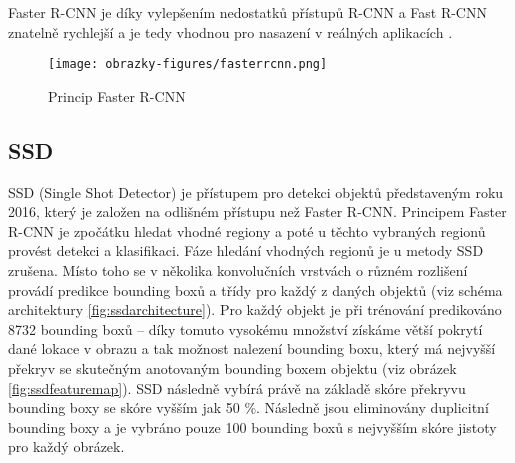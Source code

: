 Faster R-CNN je díky vylepšením nedostatků přístupů R-CNN a Fast R-CNN znatelně rychlejší a je tedy vhodnou pro nasazení v reálných aplikacích \cite{ObjectDetectionAlgorithms}.

\begin{figure}[!htbp]
    \centering
    \texttt{[image: obrazky-figures/fasterrcnn.png]}
    \caption{Princip Faster R-CNN \cite{ObjectDetectionAlgorithms}}
\end{figure} 

\subsection{SSD}

\iffalse
SSD (Single Shot Detector) je přístupem z roku 2016 pro detekci objektů, která je založena na odlišném principu než Faster R-CNN. Ve Faster R-CNN je hledání vhodných regionů a klasifikace daných regionů rozdělena, v SSD je fáze hledání vhodných regionů zrušena a metoda využívá pouze jednu konvoluční neuronovou síť. Celý vstupní obraz je na začátku přiveden na vstup konvoluční neuronové sítě. Mapy rysů jsou získány v různých měřítkách. Pomocí 3 $\times$ 3 konvolučního filtru jsou vytvořené na mapách rysů bounding boxy definující daný objekt. Najednou je definovaná hranice objektu a i jeho klasifikace do třídy. Bounding boxy se nacházejí na každé z aktivačních map a proto může být detekce provedena na objektech různého měřítka. Síť dokáže tedy získat predikce z map rysů s různě vysokým rozlišením a tak predikovat objekty rozličných velikostí. Při predikci je vypočítáno skóre pro přítomnost každé třídy pro daný objekt a offset bounding boxu pro to, aby dané ohraničení lépe odpovídalo reálnému tvaru objektu. SSD je přístupem, který zvláště díky více vrstvám pro predikci v různých měřítkách objektu, dosahuje dobré přesnosti za snížení trénovacího času a může být tedy nasazeným v reálných aplikacích \cite{SSD, SSDFasterR-CNNComparison}.
\fi

SSD (Single Shot Detector) je přístupem pro detekci objektů představeným roku 2016, který je založen na odlišném přístupu než Faster R-CNN. Principem Faster R-CNN je zpočátku hledat vhodné regiony a poté u těchto vybraných regionů provést detekci a klasifikaci. Fáze hledání vhodných regionů je u metody SSD zrušena. Místo toho se v několika konvolučních vrstvách o různém rozlišení provádí predikce bounding boxů a třídy pro každý z daných objektů (viz schéma architektury \ref{fig:ssdarchitecture}). Pro každý objekt je při trénování predikováno 8732 bounding boxů -- díky tomuto vysokému množství získáme větší pokrytí dané lokace v obrazu a tak možnost nalezení bounding boxu, který má nejvyšší překryv se skutečným anotovaným bounding boxem objektu (viz obrázek \ref{fig:ssdfeaturemap}). SSD následně vybírá právě na základě skóre překryvu bounding boxy se skóre vyšším jak 50 \%. Následně jsou eliminovány duplicitní bounding boxy a je vybráno pouze 100 bounding boxů s nejvyšším skóre jistoty pro každý obrázek.

